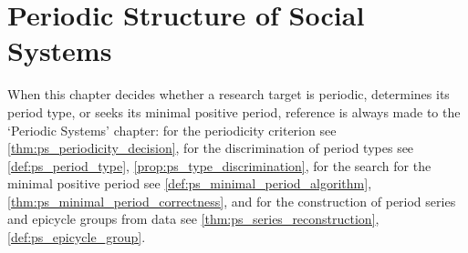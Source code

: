 \chapter{Periodic Structure of Social Systems}

\begin{remark}\label{rem:social_ps_hook}
When this chapter decides whether a research target is periodic, determines its period type, or seeks its minimal positive period, reference is always made to the `Periodic Systems' chapter:
for the periodicity criterion see \cref{thm:ps_periodicity_decision},
for the discrimination of period types see \cref{def:ps_period_type}, \cref{prop:ps_type_discrimination},
for the search for the minimal positive period see \cref{def:ps_minimal_period_algorithm}, \cref{thm:ps_minimal_period_correctness},
and for the construction of period series and epicycle groups from data see \cref{thm:ps_series_reconstruction}, \cref{def:ps_epicycle_group}.
\end{remark}

